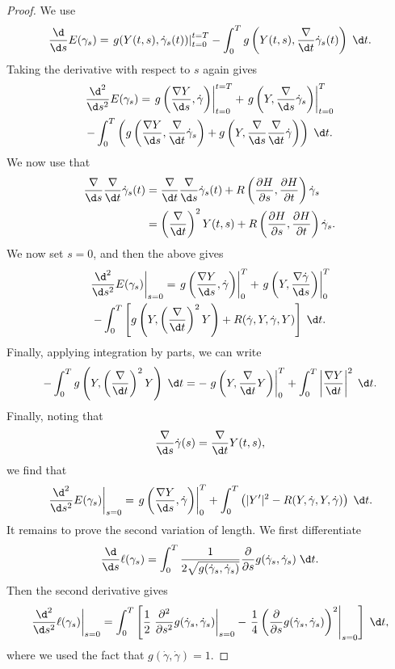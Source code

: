 \documentclass[a4paper]{article}
\begin{document}
\begin{proof}
  We use
  \[
    \frac{\d}{\d s}E(\gamma_s) = \left.g(Y(t, s), \dot{\gamma}_s(t))\right|_{t = 0}^{t = T} - \int_0^T g\left(Y(t, s), \frac{\nabla}{\d t} \dot{\gamma}_s(t)\right)\;\d t.
  \]
  Taking the derivative with respect to $s$ again gives
  \begin{multline*}
    \frac{\d^2}{\d s^2}E(\gamma_s) =\left. g\left(\frac{\nabla Y}{\d s}, \dot{\gamma}\right)\right|_{t = 0}^{t = T} + \left.g\left(Y, \frac{\nabla}{\d s} \dot{\gamma}_s\right)\right|_{t = 0}^{T} \\
    - \int_0^T \left(g\left(\frac{\nabla Y}{\d s}, \frac{\nabla}{\d t} \dot{\gamma}_s\right) + g\left(Y, \frac{\nabla}{\d s} \frac{\nabla}{\d t} \dot{\gamma}\right)\right)\;\d t.
  \end{multline*}
  We now use that
  \begin{align*}
    \frac{\nabla}{\d s} \frac{\nabla}{\d t} \dot\gamma_s(t) &= \frac{\nabla}{\d t} \frac{\nabla}{\d s} \dot{\gamma}_s(t) + R\left(\frac{\partial H}{\partial s}, \frac{\partial H}{\partial t}\right)\dot{\gamma}_s\\
    &= \left(\frac{\nabla}{\d t}\right)^2 Y(t, s) + R\left(\frac{\partial H}{\partial s}, \frac{\partial H}{\partial t}\right)\dot{\gamma}_s.
  \end{align*}
  We now set $s = 0$, and then the above gives
  \begin{multline*}
    \left.\frac{\d^2}{\d s^2} E(\gamma_s)\right|_{s = 0} = \left.g\left(\frac{\nabla Y}{\d s}, \dot{\gamma}\right)\right|_0^T + \left.g\left(Y, \frac{\nabla \dot{\gamma}}{\d s}\right)\right|_0^T \\
    - \int_0^T \left[g\left(Y, \left(\frac{\nabla}{\d t}\right)^2 Y\right) + R(\dot{\gamma}, Y, \dot{\gamma}, Y)\right]\;\d t.
  \end{multline*}
  Finally, applying integration by parts, we can write
  \[
    -\int_0^T g\left(Y, \left(\frac{\nabla}{\d t}\right)^2 Y\right) \;\d t= - \left.g\left(Y, \frac{\nabla}{\d t}Y\right)\right|_0^T + \int_0^T \left|\frac{\nabla Y}{\d t}\right|^2\;\d t.
  \]
  Finally, noting that
  \[
    \frac{\nabla}{\d s} \dot{\gamma}(s) = \frac{\nabla}{\d t} Y(t, s),
  \]
  we find that
  \[
    \left.\frac{\d^2}{\d s^2} E(\gamma_s)\right|_{s = 0} = \left.g\left(\frac{\nabla Y}{\d s}, \dot{\gamma}\right)\right|_0^T + \int_0^T \left(|Y'|^2 - R(Y, \dot{\gamma}, Y, \dot{\gamma})\right)\;\d t.
  \]
  It remains to prove the second variation of length. We first differentiate
  \[
    \frac{\d}{\d s}\ell(\gamma_s) = \int_0^T \frac{1}{2 \sqrt{g(\dot{\gamma}_s, \dot{\gamma}_s)}} \frac{\partial}{\partial s} g(\dot{\gamma}_s, \dot{\gamma}_s)\;\d t.
  \]
  Then the second derivative gives
  \[
    \left.\frac{\d^2}{\d s^2} \ell(\gamma_s) \right|_{s = 0} = \int_0^T \left[\frac{1}{2} \left.\frac{\partial^2}{\partial s^2} g(\dot{\gamma}_s, \dot{\gamma}_s) \right|_{s = 0} - \left.\frac{1}{4} \left(\frac{\partial}{\partial s} g(\dot{\gamma}_s, \dot{\gamma}_s)\right)^2\right|_{s = 0}\right]\;\d t,
  \]
  where we used the fact that $g(\dot{\gamma}, \dot{\gamma}) = 1$.


\end{proof}
\end{document}
